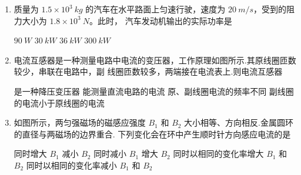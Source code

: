 
\gaokaoxz
\begin{enumerate}



\item
质量为 $ 1.5 \times 10^{3} \ kg $ 的汽车在水平路面上匀速行驶，速度为 $ 20 \ m/s $，受到的阻力大小为 $ 1.8 \times 10^3 \ N $。此时，
汽车发动机输出的实际功率是  

\fourchoices
{$ 90 \ W $}
{$ 30 \ kW $}
{$ 36 \ kW $}
{$ 300 \ kW $}




\item
电流互感器是一种测量电路中电流的变压器，工作原理如图所示.其原线圈匝数较少，串联在电路中，副
线圈匝数较多，两端接在电流表上.则电流互感器  
\begin{figure}[h!]
\centering

\end{figure}


\fourchoices
{是一种降压变压器}
{能测量直流电路的电流}
{原、副线圈电流的频率不同}
{副线圈的电流小于原线圈的电流}




\item
如图所示，两匀强磁场的磁感应强度 $ B_{1} $ 和 $ B_{2} $ 大小相等、方向相反.金属圆环的直径与两磁场的边界重合.
下列变化会在环中产生顺时针方向感应电流的是  
\begin{figure}[h!]
\centering

\end{figure}


\fourchoices
{同时增大 $ B_{1} $ 减小 $ B_{2} $}
{同时减小 $ B_{1} $ 增大 $ B_{2} $}
{同时以相同的变化率增大 $ B_{1} $ 和 $ B_{2} $}
{同时以相同的变化率减小 $ B_{1} $ 和 $ B_{2} $}





\end{enumerate}
